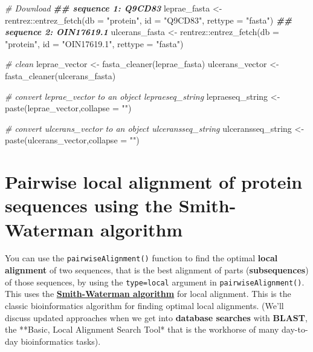 \documentclass[
]{book}
\newenvironment{Shaded}{\begin{snugshade}}{\end{snugshade}}
\newcommand{\AttributeTok}[1]{\textcolor[rgb]{0.77,0.63,0.00}{#1}}
\newcommand{\CommentTok}[1]{\textcolor[rgb]{0.56,0.35,0.01}{\textit{#1}}}
\newcommand{\DocumentationTok}[1]{\textcolor[rgb]{0.56,0.35,0.01}{\textbf{\textit{#1}}}}
\newcommand{\FunctionTok}[1]{\textcolor[rgb]{0.00,0.00,0.00}{#1}}
\newcommand{\NormalTok}[1]{#1}
\newcommand{\OtherTok}[1]{\textcolor[rgb]{0.56,0.35,0.01}{#1}}
\newcommand{\SpecialCharTok}[1]{\textcolor[rgb]{0.00,0.00,0.00}{#1}}
\newcommand{\StringTok}[1]{\textcolor[rgb]{0.31,0.60,0.02}{#1}}
\begin{document}
\begin{Shaded}
\begin{Highlighting}[]
\CommentTok{\# Download}
\DocumentationTok{\#\# sequence 1: Q9CD83}
\NormalTok{leprae\_fasta }\OtherTok{\textless{}{-}}\NormalTok{ rentrez}\SpecialCharTok{::}\FunctionTok{entrez\_fetch}\NormalTok{(}\AttributeTok{db =} \StringTok{"protein"}\NormalTok{,}
                        \AttributeTok{id =} \StringTok{"Q9CD83"}\NormalTok{,}
                         \AttributeTok{rettype =} \StringTok{"fasta"}\NormalTok{)}
\DocumentationTok{\#\# sequence 2: OIN17619.1}
\NormalTok{ulcerans\_fasta }\OtherTok{\textless{}{-}}\NormalTok{ rentrez}\SpecialCharTok{::}\FunctionTok{entrez\_fetch}\NormalTok{(}\AttributeTok{db =} \StringTok{"protein"}\NormalTok{,}
                         \AttributeTok{id =} \StringTok{"OIN17619.1"}\NormalTok{,}
                         \AttributeTok{rettype =} \StringTok{"fasta"}\NormalTok{)}

\CommentTok{\# clean}
\NormalTok{leprae\_vector   }\OtherTok{\textless{}{-}} \FunctionTok{fasta\_cleaner}\NormalTok{(leprae\_fasta)}
\NormalTok{ulcerans\_vector }\OtherTok{\textless{}{-}} \FunctionTok{fasta\_cleaner}\NormalTok{(ulcerans\_fasta)}

\CommentTok{\# convert leprae\_vector to an object lepraeseq\_string}
\NormalTok{lepraeseq\_string }\OtherTok{\textless{}{-}}\FunctionTok{paste}\NormalTok{(leprae\_vector,}\AttributeTok{collapse =} \StringTok{""}\NormalTok{)    }

\CommentTok{\# convert ulcerans\_vector to an object ulceransseq\_string}
\NormalTok{ulceransseq\_string }\OtherTok{\textless{}{-}}\FunctionTok{paste}\NormalTok{(ulcerans\_vector,}\AttributeTok{collapse =} \StringTok{""}\NormalTok{) }
\end{Highlighting}
\end{Shaded}

\hypertarget{pairwise-local-alignment-of-protein-sequences-using-the-smith-waterman-algorithm}{%
\section{Pairwise local alignment of protein sequences using the Smith-Waterman algorithm}\label{pairwise-local-alignment-of-protein-sequences-using-the-smith-waterman-algorithm}}

You can use the \texttt{pairwiseAlignment()} function to find the optimal \textbf{local alignment} of two sequences, that is the best alignment of parts (\textbf{subsequences}) of those sequences, by using the \texttt{type=local} argument in \texttt{pairwiseAlignment()}. This uses the \textbf{\href{https://en.wikipedia.org/wiki/Smith\%E2\%80\%93Waterman_algorithm}{Smith-Waterman algorithm}} for local alignment. This is the classic bioinformatics algorithm for finding optimal local alignments. (We'll discuss updated approaches when we get into \textbf{database searches} with \textbf{BLAST}, the **Basic, Local Alignment Search Tool* that is the workhorse of many day-to-day bioinformatics tasks).
\end{document}
